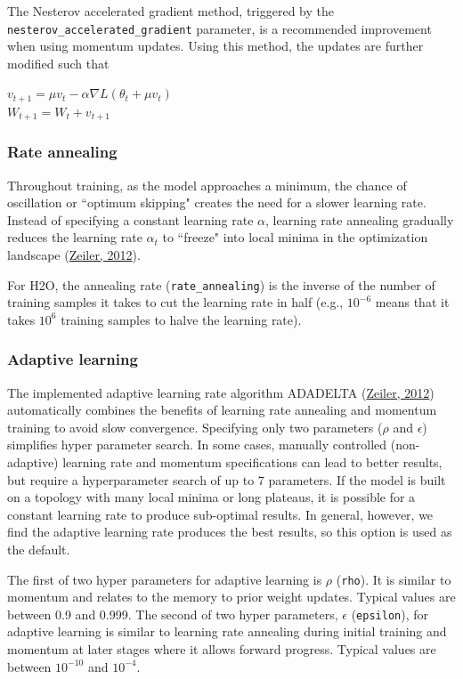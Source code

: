 The Nesterov accelerated gradient method, triggered by the  \texttt{nesterov\_accelerated\_gradient} parameter, is a recommended improvement when using momentum updates. Using this method, the updates are further modified such that 
\begin{center}
$v_{t+1} = \mu v_t - \alpha \nabla L(\theta_t + \mu v_t)$
\\
$W_{t+1} = W_t + v_{t+1}$
\end{center}
\subsubsection{Rate annealing} 
\label{sssec:RateAnnealing}

Throughout training, as the model approaches a minimum, the chance of oscillation or ``optimum skipping" creates the need for a slower learning rate. Instead of specifying a constant learning rate $\alpha$, learning rate annealing gradually reduces the learning rate $\alpha_t$ to ``freeze" into local minima in the optimization landscape (\href{http://arxiv.org/pdf/1212.5701v1.pdf}{Zeiler, 2012}).  

For H2O, the annealing rate (\texttt{rate\_annealing}) is the inverse of the number of training samples it takes to cut the learning rate in half (e.g., $10^{-6}$ means that it takes $10^6$ training samples to halve the learning rate).

\subsubsection{Adaptive learning} 
\label{sssec:AdaptiveLearning}
The implemented adaptive learning rate algorithm ADADELTA (\href{http://arxiv.org/pdf/1212.5701v1.pdf}{Zeiler, 2012})  automatically combines the benefits of learning rate annealing and momentum training to avoid slow convergence. Specifying only two parameters ($\rho$ and $\epsilon$)  simplifies hyper parameter search. In some cases, manually controlled (non-adaptive) learning rate and momentum specifications can lead to better results, but require a hyperparameter search of up to 7 parameters. If the model is built on a topology with many local minima or long plateaus, it is possible for a constant learning rate to produce sub-optimal results. In general, however, we find the adaptive learning rate produces the best results, so this option is used as the default. 

The first of two hyper parameters for adaptive learning is $\rho$ (\texttt{rho}). It is similar to momentum and relates to the memory to prior weight updates. Typical values are between 0.9 and 0.999. The second of two hyper parameters, $\epsilon$ (\texttt{epsilon}), for adaptive learning is similar to learning rate annealing during initial training and momentum at later stages where it allows forward progress.
Typical values are between $10^{-10}$ and $10^{-4}$.

